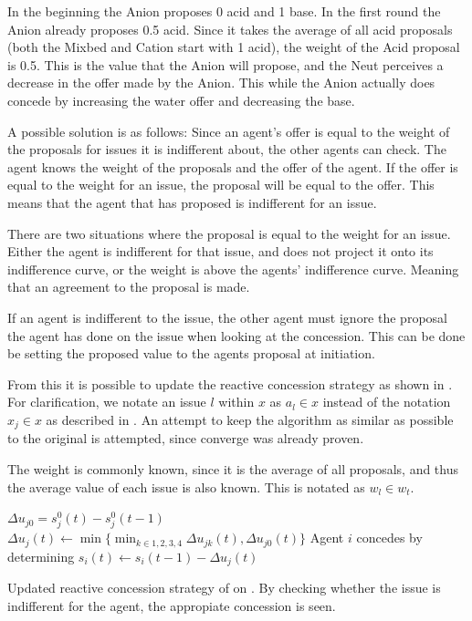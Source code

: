 In the beginning the Anion proposes 0 acid and 1 base. In the first round the Anion already proposes 0.5 acid. Since it takes the average of all acid proposals (both the Mixbed and Cation start with 1 acid), the weight of the Acid proposal is 0.5. This is the value that the Anion will propose, and the Neut perceives a decrease in the offer made by the Anion. This while the Anion actually does concede by increasing the water offer and decreasing the base.

A possible solution is as follows:
Since an agent's offer is equal to the weight of the proposals for issues it is indifferent about, the other agents can check. The agent knows the weight of the proposals and the offer of the agent. If the offer is equal to the weight for an issue, the proposal will be equal to the offer. This means that the agent that has proposed is indifferent for an issue. 

There are two situations where the proposal is equal to the weight for an issue. Either the agent is indifferent for that issue, and does not project it onto its indifference curve, or the weight is above the agents' indifference curve. Meaning that an agreement to the proposal is made.

If an agent is indifferent to the issue, the other agent must ignore the proposal the agent has done on the issue when looking at the concession. This can be done be setting the proposed value to the agents proposal at initiation.

From this it is possible to update the reactive concession strategy as shown in . For clarification, we notate an issue $l$ within $x$ as $a_l\in x$ instead of the notation $x_j \in x$ as described in . An attempt to keep the algorithm as similar as possible to the original is attempted, since converge was already proven.

The weight is commonly known, since it is the average of all proposals, and thus the average value of each issue is also known. This is notated as $w_l \in w_t$.  
 
\begin{algorithm}[h]
$\Delta u_{j0} = s^0_j(t)-s^0_j(t-1)$\;
{
	$\Delta u_j(t)\leftarrow \min \{\displaystyle \min_{k\in 1, 2, 3, 4}\Delta u_{jk}(t), \Delta u_{j0}(t)\}$ \;	
}
Agent $i$ concedes by determining $s_i(t)\leftarrow s_i(t-1)-\Delta u_j(t)$\;
\caption{Updated reactive concession strategy of  on . By checking whether the issue is indifferent for the agent, the appropiate concession is seen.}
\label{al:algorithm2}
\end{algorithm}
\clearpage
